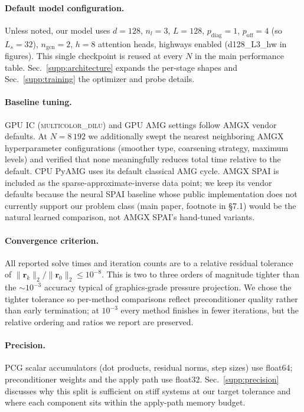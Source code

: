 \documentclass[acmtog,anonymous,review]{acmart}
\begin{document}
\paragraph{Default model configuration.}
Unless noted, our model uses $d\!=\!128$, $n_l\!=\!3$, $L\!=\!128$,
$p_{\mathrm{diag}}\!=\!1$, $p_{\mathrm{off}}\!=\!4$ (so $L_s\!=\!32$),
$n_{\mathrm{gcn}}\!=\!2$, $h\!=\!8$ attention heads, highways enabled
(\textsf{d128\_L3\_hw} in figures). This single checkpoint is reused at every $N$
in the main performance table. Sec.~\ref{supp:architecture} expands the per-stage
shapes and Sec.~\ref{supp:training} the optimizer and probe details.

\paragraph{Baseline tuning.}
GPU IC (\textsc{multicolor\_dilu}) and GPU AMG settings follow AMGX vendor
defaults. At $N\!=\!8\,192$ we additionally swept the nearest neighboring AMGX
hyperparameter configurations (smoother type, coarsening strategy, maximum levels)
and verified that none meaningfully reduces total time relative to the default.
CPU PyAMG uses its default classical AMG cycle. AMGX SPAI is included as the
sparse-approximate-inverse data point; we keep its vendor defaults because the
neural SPAI baseline whose public implementation does not currently support our
problem class (main paper, footnote in \S7.1) would be the natural learned
comparison, not AMGX SPAI's hand-tuned variants.

\paragraph{Convergence criterion.}
All reported solve times and iteration counts are to a relative residual tolerance
of $\|\mathbf{r}_k\|_2 / \|\mathbf{r}_0\|_2 \!\le\! 10^{-8}$. This is two to three
orders of magnitude tighter than the $\sim\!10^{-3}$ accuracy typical of
graphics-grade pressure projection. We chose the tighter tolerance so per-method
comparisons reflect preconditioner quality rather than early termination; at
$10^{-3}$ every method finishes in fewer iterations, but the relative ordering and
ratios we report are preserved.

\paragraph{Precision.}
PCG scalar accumulators (dot products, residual norms, step sizes) use float64;
preconditioner weights and the apply path use float32. Sec.~\ref{supp:precision}
discusses why this split is sufficient on stiff systems at our target tolerance
and where each component sits within the apply-path memory budget.
\end{document}
